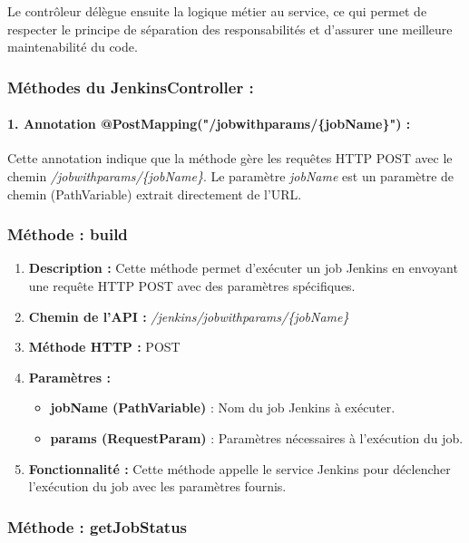 Le contrôleur délègue ensuite la logique métier au service, ce qui permet de respecter le principe de séparation des responsabilités et d’assurer une meilleure maintenabilité du code.
\subsubsection*{Méthodes du JenkinsController :}

\paragraph{1. Annotation @PostMapping("/jobwithparams/\{jobName\}") :}
Cette annotation indique que la méthode gère les requêtes HTTP POST avec le chemin \textit{/jobwithparams/\{jobName\}}. Le paramètre \textit{jobName} est un paramètre de chemin (PathVariable) extrait directement de l’URL.

\subsubsection*{Méthode : build}

\begin{enumerate}
    \item \textbf{Description :} Cette méthode permet d’exécuter un job Jenkins en envoyant une requête HTTP POST avec des paramètres spécifiques.

    \item \textbf{Chemin de l’API :} \textit{/jenkins/jobwithparams/\{jobName\}}

    \item \textbf{Méthode HTTP :} POST

    \item \textbf{Paramètres :}
    \begin{itemize}
        \item \textbf{jobName (PathVariable)} : Nom du job Jenkins à exécuter.
        \item \textbf{params (RequestParam)} : Paramètres nécessaires à l’exécution du job.
    \end{itemize}

    \item \textbf{Fonctionnalité :}  
    Cette méthode appelle le service Jenkins pour déclencher l’exécution du job avec les paramètres fournis.
\end{enumerate}

\subsubsection*{Méthode : getJobStatus}

